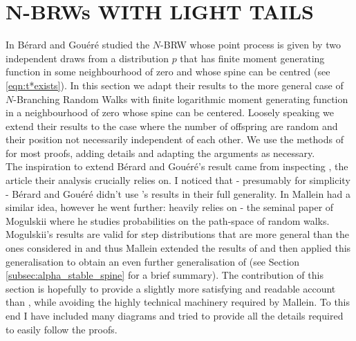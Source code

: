 \section{N-BRWs WITH LIGHT TAILS}\label{sec:light_tails}

In \cite{exp_tails} Bérard and Gouéré studied the $N$-BRW whose point process is given by two independent draws from a distribution $p$ that has finite moment generating function in some neighbourhood of zero and whose spine can be centred (see \ref{eqn:t*exists}). In this section we adapt their results to the more general case of $N$-Branching Random Walks with finite logarithmic moment generating function in a neighbourhood of zero whose spine can be centered. Loosely speaking we extend their results to the case where the number of offspring are random and their position not necessarily independent of each other. We use the methods of \cite{exp_tails} for most proofs, adding details and adapting the arguments as necessary. \\

The inspiration to extend Bérard and Gouéré's result came from inspecting \cite{gantert2008asymptotics}, the article their analysis crucially relies on. I noticed that - presumably for simplicity - Bérard and Gouéré didn't use \cite{gantert2008asymptotics}'s results in their full generality. In \cite{mallein2018n} Mallein had a similar idea, however he went further: \cite{gantert2008asymptotics} heavily relies on \cite{mogul1975small} - the seminal paper of Mogulskii where he studies probabilities on the path-space of random walks. Mogulskii's results are valid for step distributions that are more general than the ones considered in \cite{gantert2008asymptotics} and thus Mallein extended the results of \cite{gantert2008asymptotics} and then applied this generalisation to obtain an even further generalisation of \cite{exp_tails} (see Section \ref{subsec:alpha_stable_spine} for a brief summary). The contribution of this section is hopefully to provide a slightly more satisfying and readable account than \cite{exp_tails}, while avoiding the highly technical machinery required by Mallein. To this end I have included many diagrams and tried to provide all the details required to easily follow the proofs. 


